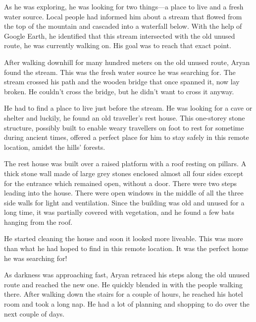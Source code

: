 As he was exploring, he was looking for two things—a place to live and a fresh water 
source. Local people had informed him about a stream that flowed from the top of the 
mountain and cascaded into a waterfall below. With the help of Google Earth, he identified
that this stream intersected with the old unused route, he was currently walking on.
His goal was to reach that exact point.

After walking downhill for many hundred meters on the old unused route, Aryan found
the stream. This was the fresh water source he was searching for. The stream
crossed his path and the wooden bridge that once spanned it, now lay broken. He
couldn't cross the bridge, but he didn't want to cross it anyway.

He had to find a place to live just before the stream. He was
looking for a cave or shelter and luckily, he found an old traveller's rest
house. This one-storey stone structure, possibly built to enable weary travellers on
foot to rest for sometime during ancient times, offered a perfect place for
him to stay safely in this remote location, amidst the hills' forests.

The rest house was built over a raised platform with a roof resting on pillars.
A thick stone wall made of large grey stones enclosed almost all four sides
except for the entrance which remained open, without a door. There were two
steps leading into the house. There were open windows in the middle of all the
three side walls for light and ventilation. Since the building was old and
unused for a long time, it was partially covered with vegetation, and he found a
few bats hanging from the roof.

He started cleaning the house and soon it looked more liveable. This was more
than what he had hoped to find in this remote location. It was the perfect home
he was searching for!

As darkness was approaching fast, Aryan retraced his steps along the old
unused route and reached the new one. He quickly blended in with the people walking there.
After walking down the stairs for a couple of hours, he reached his hotel room and took a 
long nap. He had a lot of planning and shopping to do over the next couple of days.